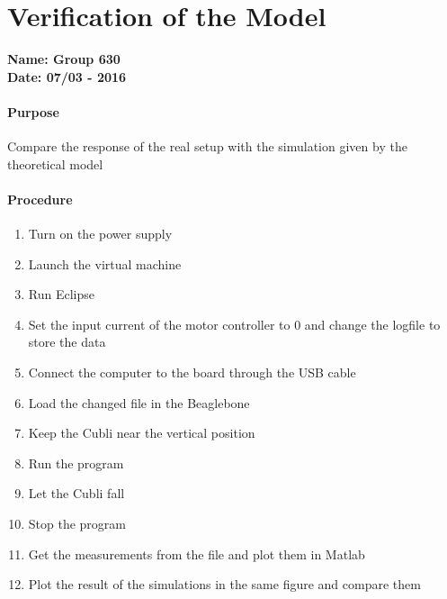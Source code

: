 \chapter{Verification of the Model}\label{verificationModel} 
\textbf{Name: Group 630}\\
\textbf{Date: 07/03 - 2016}

\subsubsection{Purpose}
Compare the response of the real setup with the simulation given by the theoretical model

\subsubsection{Procedure}
\begin{enumerate}
	\item Turn on the power supply
	\item Launch the virtual machine
	\item Run Eclipse
	\item Set the input current of the motor controller to 0 and change the logfile to store the data
	\item Connect the computer to the board through the USB cable
	\item Load the changed file in the Beaglebone
	\item Keep the Cubli near the vertical position
	\item Run the program
	\item Let the Cubli fall
	\item Stop the program
	\item Get the measurements from the file and plot them in Matlab
	\item Plot the result of the simulations in the same figure and compare them

\end{enumerate}

